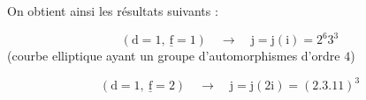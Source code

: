 On obtient ainsi les résultats suivants :

\begingroup
\makeatletter\tagsleft@true\makeatother
\[
(\mathrm{d}=1,\ \underline{\mathrm{f}}=1)\quad \rightarrow\quad
\mathrm{j}=\mathrm{j}(\mathrm{i})=2^{6}3^{3}
\tag*{1.1.}
\]
(courbe elliptique ayant un groupe d'automorphismes d'ordre $4$)

\[
(\mathrm{d}=1,\ \underline{\mathrm{f}}=2)\quad \rightarrow\quad
\mathrm{j}=\mathrm{j}(2\mathrm{i})=(2.3.11)^{3}
\tag*{1.2}
\]
\endgroup
